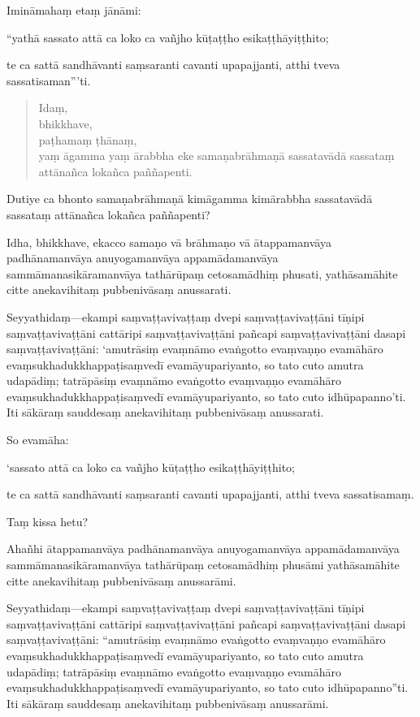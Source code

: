 \documentclass[11pt,twoside,openright]{book}
\begin{document}
\pstart
Imināmahaṃ etaṃ jānāmi:
\pend

\pstart
“yathā sassato attā ca loko ca vañjho kūṭaṭṭho esikaṭṭhāyiṭṭhito;
\pend

\pstart
te ca sattā sandhāvanti saṃsaranti cavanti upapajjanti, atthi tveva sassatisaman”’ti.
\pend

\begin{verse}
Idaṃ,\\
\vin  bhikkhave,\\
\vin  paṭhamaṃ ṭhānaṃ,\\
\vin  yaṃ āgamma yaṃ ārabbha eke samaṇabrāhmaṇā sassatavādā sassataṃ attānañca lokañca paññapenti.

\end{verse}
\pstart
Dutiye ca bhonto samaṇabrāhmaṇā kimāgamma kimārabbha sassatavādā sassataṃ attānañca lokañca paññapenti?
\pend

\pstart
Idha, bhikkhave, ekacco samaṇo vā brāhmaṇo vā ātappamanvāya padhānamanvāya anuyogamanvāya appamādamanvāya sammāmanasikāramanvāya tathārūpaṃ cetosamādhiṃ phusati, yathāsamāhite citte anekavihitaṃ pubbenivāsaṃ anussarati.
\pend

\pstart
Seyyathidaṃ—ekampi saṃvaṭṭavivaṭṭaṃ dvepi saṃvaṭṭavivaṭṭāni tīṇipi saṃvaṭṭavivaṭṭāni cattāripi saṃvaṭṭavivaṭṭāni pañcapi saṃvaṭṭavivaṭṭāni dasapi saṃvaṭṭavivaṭṭāni: ‘amutrāsiṃ evaṃnāmo evaṅgotto evaṃvaṇṇo evamāhāro evaṃsukhadukkhappaṭisaṃvedī evamāyupariyanto, so tato cuto amutra udapādiṃ; tatrāpāsiṃ evaṃnāmo evaṅgotto evaṃvaṇṇo evamāhāro evaṃsukhadukkhappaṭisaṃvedī evamāyupariyanto, so tato cuto idhūpapanno’ti. Iti sākāraṃ sauddesaṃ anekavihitaṃ pubbenivāsaṃ anussarati.
\pend

\pstart
So evamāha:
\pend

\pstart
‘sassato attā ca loko ca vañjho kūṭaṭṭho esikaṭṭhāyiṭṭhito;
\pend

\pstart
te ca sattā sandhāvanti saṃsaranti cavanti upapajjanti, atthi tveva sassatisamaṃ.
\pend

\pstart
Taṃ kissa hetu?
\pend

\pstart
Ahañhi ātappamanvāya padhānamanvāya anuyogamanvāya appamādamanvāya sammāmanasikāramanvāya tathārūpaṃ cetosamādhiṃ phusāmi yathāsamāhite citte anekavihitaṃ pubbenivāsaṃ anussarāmi.
\pend

\pstart
Seyyathidaṃ—ekampi saṃvaṭṭavivaṭṭaṃ dvepi saṃvaṭṭavivaṭṭāni tīṇipi saṃvaṭṭavivaṭṭāni cattāripi saṃvaṭṭavivaṭṭāni pañcapi saṃvaṭṭavivaṭṭāni dasapi saṃvaṭṭavivaṭṭāni: “amutrāsiṃ evaṃnāmo evaṅgotto evaṃvaṇṇo evamāhāro evaṃsukhadukkhappaṭisaṃvedī evamāyupariyanto, so tato cuto amutra udapādiṃ; tatrāpāsiṃ evaṃnāmo evaṅgotto evaṃvaṇṇo evamāhāro evaṃsukhadukkhappaṭisaṃvedī evamāyupariyanto, so tato cuto idhūpapanno”ti. Iti sākāraṃ sauddesaṃ anekavihitaṃ pubbenivāsaṃ anussarāmi.
\pend
\end{document}
